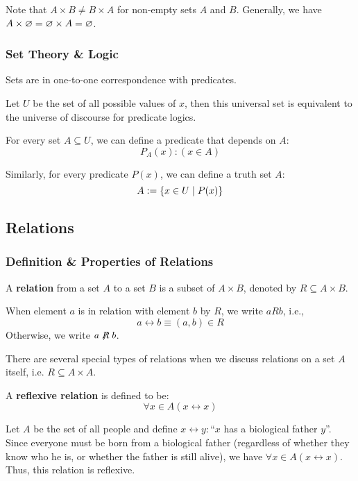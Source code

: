 \begin{remark}
    Note that $A\times B\neq B\times A$ for non-empty sets $A$ and $B$.
    Generally, we have $A\times \varnothing = \varnothing\times A = \varnothing$.
\end{remark}

\subsubsection{Set Theory \& Logic}

Sets are in one-to-one correspondence with predicates.

\begin{theorem}
    Let $U$ be the set of all possible values of $x$, then this universal set is equivalent
    to the universe of discourse for predicate logics.

    For every set $A \subseteq U$, we can define a predicate that depends on $A$:
    \[
        P_A(x) : (x \in A)
    \]

    Similarly, for every predicate $P(x)$, we can define a truth set $A$:
    \[
        A := \{x \in U \mid P(x)\}
    \]
\end{theorem}

\subsection{Relations}

\subsubsection{Definition \& Properties of Relations}

\begin{definition}[Relation]
    A \textbf{relation} from a set $A$ to a set $B$ is a subset of $A \times B$, denoted by
    $R \subseteq A\times B$.

    When element $a$ is in relation with element $b$ by $R$, we write $aRb$, i.e.,
    \[
        a\rel b \equiv (a, b) \in R
    \]
    Otherwise, we write $a \notrel b$.
\end{definition}

There are several special types of relations when we discuss relations on a set $A$ itself,
i.e. $R \subseteq A \times A$.

\begin{definition}
    A \textbf{reflexive relation} is defined to be:
    \[
        \forall x\in A (x\rel x)
    \]
\end{definition}
\begin{example}
    Let $A$ be the set of all people and define $x\rel y: \text{``}x$ has a biological father $y$''.
    Since everyone must be born from a biological father (regardless of whether they know who
    he is, or whether the father is still alive), we have $\forall x\in A (x\rel x)$.
    Thus, this relation is reflexive.
\end{example}

